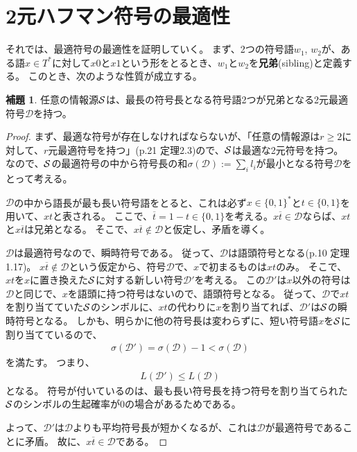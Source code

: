 \documentclass[pdflatex, ja=standard, a4paper]{bxjsarticle}
\theoremstyle{definition}
\newtheorem{lemma}{補題}
\begin{document}
\section{2元ハフマン符号の最適性}
それでは、最適符号の最適性を証明していく。
まず、2つの符号語$w_1$, $w_2$が、ある語$x \in T^*$に対して$x 0$と$x 1$という形をとるとき、$w_1$と$w_2$を\textbf{兄弟}(sibling)と定義する。
このとき、次のような性質が成立する。
\newcommand{\optimizecode}{\mathcal{D}}
\begin{lemma}
    任意の情報源$\mathcal{S}$は、最長の符号長となる符号語2つが兄弟となる2元最適符号$\optimizecode$を持つ。
\end{lemma}
\begin{proof}
    まず、最適な符号が存在しなければならないが、「任意の情報源は$r \geq 2$に対して、$r$元最適符号を持つ」(p.21 定理2.3)ので、$\mathcal{S}$は最適な2元符号を持つ。
    なので、$\mathcal{S}$の最適符号の中から符号長の和$\sigma(\optimizecode) := \sum_i l_i$が最小となる符号$\optimizecode$をとって考える。

    $\optimizecode$の中から語長が最も長い符号語をとると、これは必ず$x \in \{0, 1\}^*$と$t \in \{0, 1\}$を用いて、$xt$と表される。
    ここで、$\overline{t} = 1 - t \in \{0, 1\}$を考える。$x \overline{t} \in \optimizecode$ならば、$x t$と$x \overline{t}$は兄弟となる。
    そこで、$x \overline{t} \not \in \optimizecode$と仮定し、矛盾を導く。

    $\optimizecode$は最適符号なので、瞬時符号である。
    従って、$\optimizecode$は語頭符号となる(p.10 定理1.17)。
    $x\overline{t} \not \in \optimizecode$という仮定から、符号$\optimizecode$で、$x$で初まるものは$x t$のみ。
    そこで、$x t$を$x$に置き換えた$\mathcal{S}$に対する新しい符号$\optimizecode'$を考える。
    この$\optimizecode'$は$x$以外の符号は$\optimizecode$と同じで、$x$を語頭に持つ符号はないので、語頭符号となる。
    従って、$\optimizecode$で$x t$を割り当てていた$\mathcal{S}$のシンボルに、$x t $の代わりに$x$を割り当てれば、$\optimizecode'$は$\mathcal{S}$の瞬時符号となる。
    しかも、明らかに他の符号長は変わらずに、短い符号語$x$を$\mathcal{S}$に割り当てているので、
    \begin{align*}
        \sigma(\optimizecode') = \sigma(\optimizecode) - 1 < \sigma(\optimizecode)
    \end{align*}
    を満たす。
    つまり、
    \begin{align*}
        L(\optimizecode') \leq L(\optimizecode)
    \end{align*}
    となる。
    符号が付いているのは、最も長い符号長を持つ符号を割り当てられた$\mathcal{S}$のシンボルの生起確率が$0$の場合があるためである。

    よって、$\optimizecode'$は$\optimizecode$よりも平均符号長が短かくなるが、これは$\optimizecode$が最適符号であることに矛盾。
    故に、$x \overline{t} \in \optimizecode$である。
\end{proof}
\end{document}
